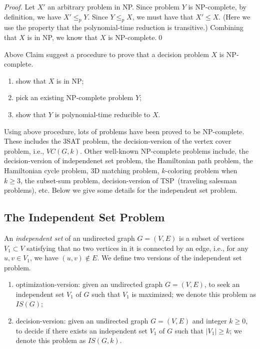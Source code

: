 \emph{Proof.} Let $X'$ an arbitrary problem in NP. Since problem $Y$ is NP-complete,
by definition, we have $X' \le_p Y$. Since $Y\le_p X$, we must have that $X'\le X$.
(Here we use the property that the polynomial-time reduction is transitive.)
Combining that $X$ is in NP, we know that $X$ is NP-complete.\qed

Above Claim suggest a procedure to prove that a decision problem $X$ is NP-complete.
\vspace*{-\topsep}
\begin{enumerate}
\item show that $X$ is in NP;
\item pick an existing NP-complete problem $Y$;
\item show that $Y$ is polynomial-time reducible to $X$. 
\end{enumerate}

Using above procedure, lots of problems have been proved to be NP-complete.
These includes the 3SAT problem, the decision-version of the vertex cover problem, i.e., $VC(G,k)$.
Other well-known NP-complete problems include, the decision-version of independenet set problem,
the Hamiltonian path problem, 
the Hamiltonian cycle problem, 
3D matching problem, $k$-coloring problem when $k\ge 3$, the subset-sum problem, decision-version of TSP~(traveling salesman problems), etc.
Below we give some details for the independent set problem.

\subsection*{The Independent Set Problem}

An \emph{independent set} of an undirected graph $G = (V, E)$
is a subset of vertices $V_1\subset V$ satisfying that no two vertices in it is connected by an edge, i.e.,
for any $u,v\in V_1$, we have $(u,v)\not\in E$. We define two versions of the independent set problem.
\vspace*{-\topsep}
\begin{enumerate}
\item optimization-version: given an undirected graph $G = (V, E)$, to seek an independent set $V_1$ of $G$ such that $V_1$ is maximized; we denote this problem as $IS(G)$;
\item decision-version: given an undirected graph $G = (V, E)$ and integer $k\ge 0$, to decide if there exists an independent set $V_1$ of $G$ such that $|V_1| \ge k$;
we denote this problem as $IS(G,k)$.
\end{enumerate}

